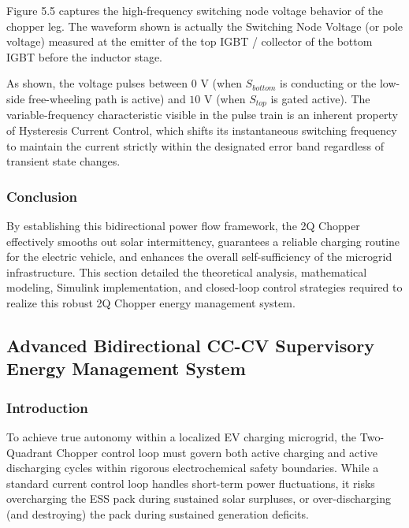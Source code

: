 Figure 5.5 captures the high-frequency switching node voltage behavior of the chopper leg. The waveform shown is actually the Switching Node Voltage (or pole voltage) measured at the emitter of the top IGBT / collector of the bottom IGBT before the inductor stage.

As shown, the voltage pulses between $0\text{ V}$ (when $S_{bottom}$ is conducting or the low-side free-wheeling path is active) and $10\text{ V}$ (when $S_{top}$ is gated active). The variable-frequency characteristic visible in the pulse train is an inherent property of Hysteresis Current Control, which shifts its instantaneous switching frequency to maintain the current strictly within the designated error band regardless of transient state changes.

\subsubsection{Conclusion}
By establishing this bidirectional power flow framework, the 2Q Chopper effectively smooths out solar intermittency, guarantees a reliable charging routine for the electric vehicle, and enhances the overall self-sufficiency of the microgrid infrastructure. This section detailed the theoretical analysis, mathematical modeling, Simulink implementation, and closed-loop control strategies required to realize this robust 2Q Chopper energy management system.

\subsection{Advanced Bidirectional CC-CV Supervisory Energy Management System}

\subsubsection{Introduction}
To achieve true autonomy within a localized EV charging microgrid, the Two-Quadrant Chopper control loop must govern both active charging and active discharging cycles within rigorous electrochemical safety boundaries. While a standard current control loop handles short-term power fluctuations, it risks overcharging the ESS pack during sustained solar surpluses, or over-discharging (and destroying) the pack during sustained generation deficits.

